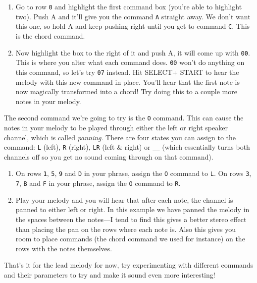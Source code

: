 \documentclass[]{article}
\newcommand{\buttonStyle}[1]{\textsf{#1}\xspace}
\newcommand{\bA}{\buttonStyle{A}}
\newcommand{\bStart}{\buttonStyle{{START}}}
\newcommand{\bSelect}{\buttonStyle{{SELECT}}}
\newcommand{\nb}[1]{\texttt{#1}\xspace}
\begin{document}
\begin{enumerate}
	
\item Go to row \nb{0} and highlight the first command box (you're able to highlight two). Push \bA and it'll give you the command \nb{A} straight away. We don't want this one, so hold \bA and keep pushing right until you get to command \nb{C}. This is the chord command.

\item Now highlight the box to the right of it and push \bA, it will come up with \nb{00}. This is where you alter what each command does. \nb{00} won't do anything on this command, so let's try \nb{07} instead. Hit \bSelect + \bStart to hear the melody with this new command in place. You'll hear that the first note is now magically transformed into a chord! Try doing this to a couple more notes in your melody.

\end{enumerate}

The second command we're going to try is the \nb{O} command. This can cause the notes in your melody to be played through either the left or right speaker channel, which is called \textit{panning}. There are four states you can assign to the command: \nb{L} (left), \nb{R} (right), \nb{LR} (left \& right) or \nb{\_\_} (which essentially turns both channels off so you get no sound coming through on that command).

\begin{enumerate}[resume]
	
\item  On rows \nb{1}, \nb{5}, \nb{9} and \nb{D} in your phrase, assign the \nb{O} command to \nb{L}. On rows \nb{3}, \nb{7}, \nb{B} and \nb{F} in your phrase, assign the \nb{O} command to \nb{R}.

\item Play your melody and you will hear that after each note, the channel is panned to either left or right. In this example we have panned the melody in the spaces between the notes---I tend to find this gives a better stereo effect than placing the pan on the rows where each note is. Also this gives you room to place commands (the chord command we used for instance) on the rows with the notes themselves.

\end{enumerate}

That's it for the lead melody for now, try experimenting with different commands and their parameters to try and make it sound even more interesting!
\end{document}
